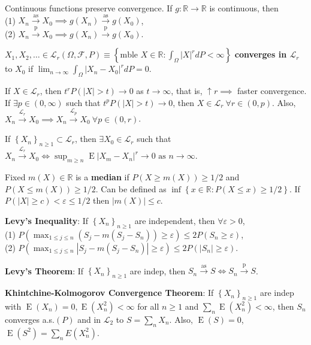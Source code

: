 \documentclass[paper=letter,fontsize=2.89mm]{scrartcl}
\DeclareMathOperator{\E}{E}
\newcommand{\convprob}{\stackrel{\text{p}}{\longrightarrow}}
\newcommand{\convas}{\stackrel{\text{as}}{\longrightarrow}}
\newcommand{\convL}[1]{\stackrel{\mathcal{L}_{#1}}{\longrightarrow}}
\newcommand{\eps}{\varepsilon}
\newcommand{\R}{\mathbb{R}}
\newcommand\abs[1]{\left| #1 \right|}
\newcommand\set[1]{\left\{ #1 \right\}}
\begin{document}
\begin{multicols*}{3}
Continuous functions preserve convergence. If $g: \R \to \R$ is continuous, then \\
(1) $X_n \convas X_0 \implies g(X_n) \convas g(X_0)$, \\
(2) $X_n \convprob X_0 \implies g(X_n) \convprob g(X_0)$. \\ \medskip

$X_1, X_2, \dots \in \mathcal{L}_r(\Omega, \mathcal{F}, P) \equiv \set{\text{mble } X \in \R: \int_\Omega \abs{X}^r dP < \infty}$ \textbf{converges in $\mathcal{L}_r$} to $X_0$ if 
$\lim_{n\to\infty} \int_\Omega \abs{X_n - X_0}^r dP = 0.$ \\ \medskip

If $X \in \mathcal{L}_r$, then $t^r P(\abs{X} > t) \to 0$ as $t \to \infty$, that is, $\uparrow r \implies$ faster convergence. If $\exists p \in (0,\infty)$ such that $t^p P(\abs{X} > t) \to 0$, then $X \in \mathcal{L}_r ~\forall r \in (0, p)$. Also, $X_n \convL{r}  X_0 \implies X_n \convL{p} X_0 ~ \forall p \in (0,r)$.  \\\medskip

If $\set{X_n}_{n\ge1} \subset \mathcal{L}_r$, then $\exists X_0 \in \mathcal{L}_r$ such that $X_n \convL{r} X_0 \iff \sup_{m\ge n} \E\abs{X_m-X_n}^r \to 0 \text{ as } n \to \infty.$ \\ \medskip

Fixed $m(X) \in \R$ is a \textbf{median} if $P(X \ge m(X)) \ge 1/2$ and $P(X \le m(X)) \ge 1/2$. Can be defined as $\inf\set{x \in \R: P(X \le x) \ge 1/2}$. If $P(\abs{X} \ge c) < \eps \le 1/2$ then $\abs{m(X)} \le c$. \\\medskip

\textbf{Levy's Inequality}: If $\set{X_n}_{n\ge1}$ are independent, then $\forall \eps > 0$, \\
(1) $P\left( \max_{1\le j \le n}\left( S_j - m(S_j-S_n)\right) \ge \eps\right) \le 2P(S_n \ge \eps)$, \\
(2) $P\left( \max_{1\le j \le n}\abs{ S_j - m(S_j-S_n)} \ge \eps\right) \le 2P(\abs{S_n} \ge \eps)$. \\ \medskip

\textbf{Levy's Theorem}: If $\set{X_n}_{n\ge1}$ are indep, then $S_n \convas S \iff S_n \convprob S$. \\\medskip

\textbf{Khintchine-Kolmogorov Convergence Theorem}: If $\set{X_n}_{n\ge1}$ are indep with $\E(X_n) = 0, \E(X_n^2) < \infty$ for all $n \ge 1$ and $\sum_n \E(X_n^2) < \infty$, then $S_n$ converges a.s.$(P)$ and in $\mathcal{L}_2$ to $S = \sum_n X_n$. Also, $\E(S) = 0$, $\E(S^2) = \sum_n E(X_n^2)$. \\\medskip


\end{multicols*}
\end{document}
